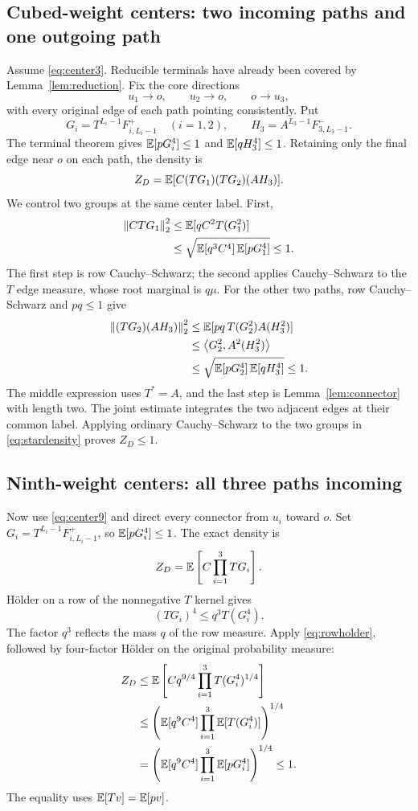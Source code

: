 \subsection{Cubed-weight centers: two incoming paths and one outgoing path}
Assume \eqref{eq:center3}. Reducible terminals have already been covered by Lemma~\ref{lem:reduction}. Fix the core directions
\[
 u_1\longrightarrow o,\qquad u_2\longrightarrow o,
 \qquad o\longrightarrow u_3,
\]
with every original edge of each path pointing consistently. Put
\[
 G_i=T^{L_i-1}F^+_{i,L_i-1}\quad(i=1,2),\qquad
 H_3=A^{L_3-1}F^-_{3,L_3-1}.
\]
The terminal theorem gives $\mathbb E[pG_i^4]\le1$ and $\mathbb E[qH_3^4]\le1$. Retaining only the final edge near $o$ on each path, the density is
\begin{equation}\label{eq:stardensity}
 Z_D=\mathbb E[C(TG_1)(TG_2)(AH_3)].
\end{equation}
We control two groups at the same center label. First,
\begin{align}
 \left\lVert CTG_1\right\rVert_2^2
 &\le\mathbb E[qC^2T(G_1^2)]\notag\\
 &\le\sqrt{\mathbb E[q^3C^4]\,\mathbb E[pG_1^4]}\le1.\label{eq:starfirst}
\end{align}
The first step is row Cauchy--Schwarz; the second applies Cauchy--Schwarz to the $T$ edge measure, whose root marginal is $q\mu$.
For the other two paths, row Cauchy--Schwarz and $pq\le1$ give
\begin{align}
 \left\lVert(TG_2)(AH_3)\right\rVert_2^2
 &\le\mathbb E[pq\,T(G_2^2)A(H_3^2)]\notag\\
 &\le\left\langle G_2^2,A^2(H_3^2)\right\rangle\notag\\
 &\le\sqrt{\mathbb E[pG_2^4]\,\mathbb E[qH_3^4]}\le1.\label{eq:starsecond}
\end{align}
The middle expression uses $T^*=A$, and the last step is Lemma~\ref{lem:connector} with length two. The joint estimate integrates the two adjacent edges at their common label. Applying ordinary Cauchy--Schwarz to the two groups in \eqref{eq:stardensity} proves $Z_D\le1$.

\subsection{Ninth-weight centers: all three paths incoming}
Now use \eqref{eq:center9} and direct every connector from $u_i$ toward $o$. Set $G_i=T^{L_i-1}F^+_{i,L_i-1}$, so $\mathbb E[pG_i^4]\le1$. The exact density is
\[
 Z_D=\mathbb E\left[C\prod_{i=1}^3TG_i\right].
\]
H\"older on a row of the nonnegative $T$ kernel gives
\begin{equation}\label{eq:rowholder}
 (TG_i)^4\le q^3T(G_i^4).
\end{equation}
The factor $q^3$ reflects the mass $q$ of the row measure. Apply \eqref{eq:rowholder}, followed by four-factor H\"older on the original probability measure:
\begin{align*}
 Z_D&\le\mathbb E\left[Cq^{9/4}\prod_{i=1}^3T(G_i^4)^{1/4}\right]\\
 &\le\left(\mathbb E[q^9C^4]\prod_{i=1}^3\mathbb E[T(G_i^4)]\right)^{1/4}\\
 &=\left(\mathbb E[q^9C^4]\prod_{i=1}^3\mathbb E[pG_i^4]\right)^{1/4}\le1.
\end{align*}
The equality uses $\mathbb E[Tv]=\mathbb E[pv]$.

